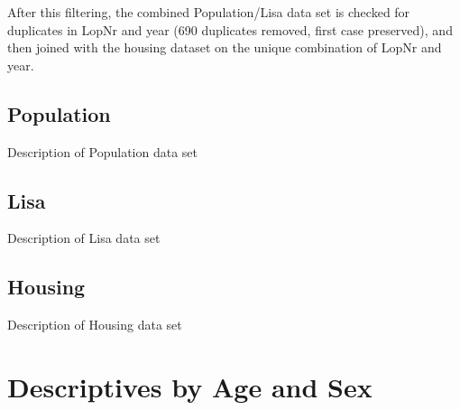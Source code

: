 \documentclass[
]{book}
\begin{document}
After this filtering, the combined Population/Lisa data set is checked for duplicates in LopNr and year (690 duplicates removed, first case preserved), and then joined with the housing dataset on the unique combination of LopNr and year.

\hypertarget{population}{%
\section{Population}\label{population}}

Description of Population data set

\hypertarget{lisa}{%
\section{Lisa}\label{lisa}}

Description of Lisa data set

\hypertarget{housing}{%
\section{Housing}\label{housing}}

Description of Housing data set

\hypertarget{descriptives-by-age-and-sex}{%
\chapter{Descriptives by Age and Sex}\label{descriptives-by-age-and-sex}}
\end{document}
